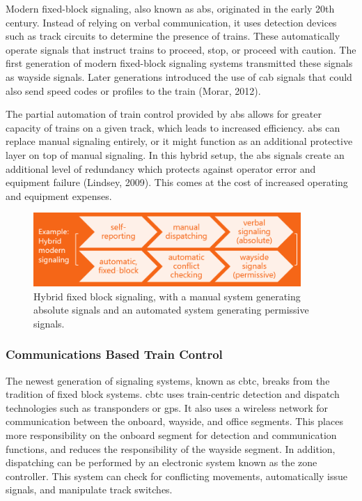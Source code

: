 \documentclass[11pt, titlepage]{article}
\begin{document}
Modern fixed-block signaling, also known as \gls{abs}, originated in the early 20th
century. Instead of relying on verbal communication, it uses detection devices such
as track circuits to determine the presence of trains. These automatically operate
signals that instruct trains to proceed, stop, or proceed with caution. The first
generation of modern fixed-block signaling systems transmitted these signals as
wayside signals. Later generations introduced the use of cab signals that could
also send speed codes or profiles to the train (Morar, 2012).

The partial automation of train control provided by \gls{abs} allows for greater
capacity of trains on a given track, which leads to increased efficiency. \gls{abs}
can replace manual signaling entirely, or it might function as an additional
protective layer on top of manual signaling. In this hybrid setup, the \gls{abs}
signals create an additional level of redundancy which protects against operator
error and equipment failure (Lindsey, 2009). This comes at the cost of increased
operating and equipment expenses.

\begin{figure}[ht]
    \begin{center}
        \includegraphics[width=4in]{HybridSignaling.png}
        \captionsetup{justification=centering}
        \caption[Hybrid Fixed-Block Signaling]{Hybrid fixed block signaling, with
        a manual system generating absolute signals and an automated system generating
        permissive signals.}
    \end{center}
\end{figure}

\subsubsection{Communications Based Train Control}

The newest generation of signaling systems, known as \gls{cbtc}, breaks from the
tradition of fixed block systems. \gls{cbtc} uses train-centric detection and
dispatch technologies such as transponders or \gls{gps}. It also uses a wireless
network for communication between the onboard, wayside, and office segments. This
places more responsibility on the onboard segment for detection and communication
functions, and reduces the responsibility of the wayside segment. In addition,
dispatching can be performed by an electronic system known as the zone controller.
This system can check for conflicting movements, automatically issue signals, and
manipulate track switches.
\end{document}
